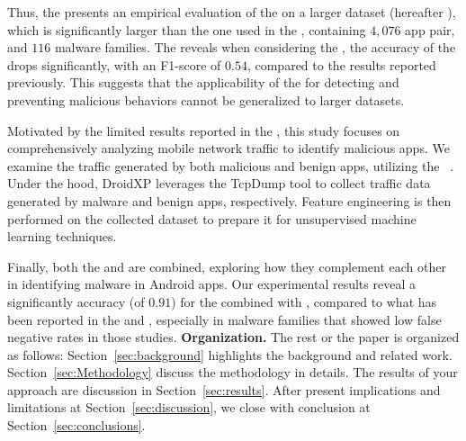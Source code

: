 Thus, the \fhc presents an empirical evaluation of the \mas on a larger dataset (hereafter \cds), which is significantly larger than the one used in the \blls, containing $4,076$ app pair, and $116$ malware families. The \fhc reveals when considering the \cds, the accuracy of the \mas drops significantly, with an F1-score of $0.54$, compared to the results reported previously. This suggests that the applicability of the \mas for detecting and preventing malicious behaviors cannot be generalized to larger datasets.


Motivated by the limited results reported in the \fhc, this study focuses on comprehensively analyzing mobile network traffic to identify malicious apps. We examine the traffic generated by both malicious and benign apps, utilizing the \droidxp~\cite{DBLP:conf/scam/CostaMCMVBC20}. Under the hood, DroidXP leverages the TcpDump tool to collect traffic data generated by malware and benign apps, respectively. Feature engineering is then performed on the collected dataset to prepare it for unsupervised machine learning techniques.

Finally, both the \mas and \net are combined, exploring how they complement each other in identifying malware in Android apps. Our experimental results reveal a significantly accuracy (\fone of $0.91$) for the \mas combined with \net, compared to what has been reported in the \fhc and \blls, especially in malware families that showed low false negative rates in those studies.\newline\newline
\textbf{Organization.} The rest or the paper is organized as follows: Section~\ref{sec:background} highlights the background and related work. Section~\ref{sec:Methodology} discuss the methodology in details. The results of your approach are discussion in Section~\ref{sec:results}. After present implications and limitations at Section~\ref{sec:discussion}, we close with conclusion at Section~\ref{sec:conclusions}.



